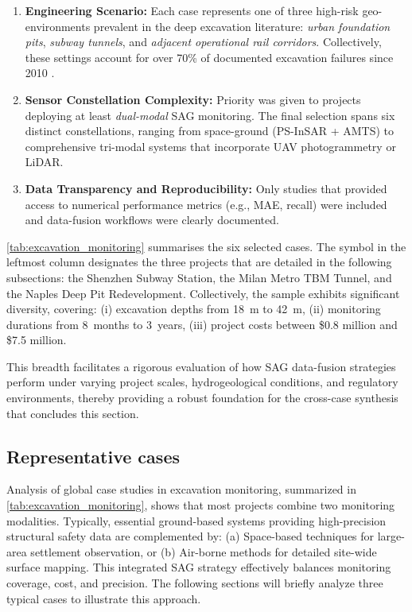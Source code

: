 \documentclass[preprint,11pt,authoryear,3p]{elsarticle}
\begin{document}
\begin{enumerate}
    \item \textbf{Engineering Scenario:} Each case represents one of three high-risk geo-environments prevalent in the deep excavation literature: \emph{urban foundation pits}, \emph{subway tunnels}, and \emph{adjacent operational rail corridors}. Collectively, these settings account for over 70\% of documented excavation failures since 2010 \citep{Tan2023Failures,JIANG2022103509}.
    \item \textbf{Sensor Constellation Complexity:} Priority was given to projects deploying at least \emph{dual-modal} SAG monitoring. The final selection spans six distinct constellations, ranging from space-ground (PS-InSAR + AMTS) to comprehensive tri-modal systems that incorporate UAV photogrammetry or LiDAR.
    \item \textbf{Data Transparency and Reproducibility:} Only studies that provided access to numerical performance metrics (e.g., MAE, recall) were included and data-fusion workflows were clearly documented. 
\end{enumerate}

\autoref{tab:excavation_monitoring} summarises the six selected cases. The symbol  in the leftmost column designates the three projects that are detailed in the following subsections: the Shenzhen Subway Station, the Milan Metro TBM Tunnel, and the Naples Deep Pit Redevelopment. Collectively, the sample exhibits significant diversity, covering: (i) excavation depths from 18~m to 42~m, (ii) monitoring durations from 8~months to 3~years, (iii) project costs between \$0.8 million and \$7.5 million.

This breadth facilitates a rigorous evaluation of how SAG data-fusion strategies perform under varying project scales, hydrogeological conditions, and regulatory environments, thereby providing a robust foundation for the cross-case synthesis that concludes this section.

\subsection{Representative cases}

Analysis of global case studies in excavation monitoring, summarized in \autoref{tab:excavation_monitoring}, shows that most projects combine two monitoring modalities. Typically, essential ground-based systems providing high-precision structural safety data are complemented by: (a) Space-based techniques for large-area settlement observation, or (b) Air-borne methods for detailed site-wide surface mapping. This integrated SAG strategy effectively balances monitoring coverage, cost, and precision. The following sections will briefly analyze three typical cases to illustrate this approach.
\end{document}
